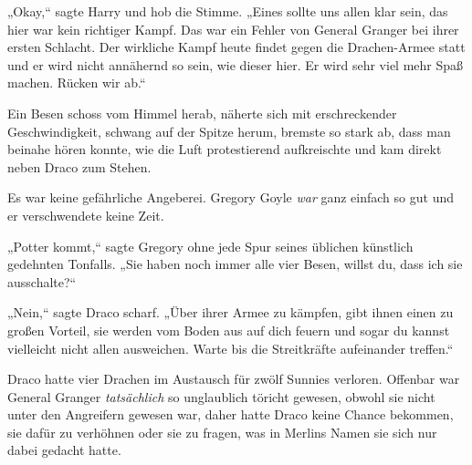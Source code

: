 „Okay,“ sagte Harry und hob die Stimme. „Eines sollte uns allen klar sein, das hier war kein richtiger Kampf. Das war ein Fehler von General Granger bei ihrer ersten Schlacht. Der wirkliche Kampf heute findet gegen die Drachen-Armee statt und er wird nicht annähernd so sein, wie dieser hier. Er wird sehr viel mehr Spaß machen. Rücken wir ab.“

\later

Ein Besen schoss vom Himmel herab, näherte sich mit erschreckender Geschwindigkeit, schwang auf der Spitze herum, bremste so stark ab, dass man beinahe hören konnte, wie die Luft protestierend aufkreischte und kam direkt neben Draco zum Stehen.

Es war keine gefährliche Angeberei. Gregory Goyle \emph{war} ganz einfach so gut und er verschwendete keine Zeit.

„Potter kommt,“ sagte Gregory ohne jede Spur seines üblichen künstlich gedehnten Tonfalls. „Sie haben noch immer alle vier Besen, willst du, dass ich sie ausschalte?“

„Nein,“ sagte Draco scharf. „Über ihrer Armee zu kämpfen, gibt ihnen einen zu großen Vorteil, sie werden vom Boden aus auf dich feuern und sogar du kannst vielleicht nicht allen ausweichen. Warte bis die Streitkräfte aufeinander treffen.“

Draco hatte vier Drachen im Austausch für zwölf Sunnies verloren. Offenbar war General Granger \emph{tatsächlich} so unglaublich töricht gewesen, obwohl sie nicht unter den Angreifern gewesen war, daher hatte Draco keine Chance bekommen, sie dafür zu verhöhnen oder sie zu fragen, was in Merlins Namen sie sich nur dabei gedacht hatte.

